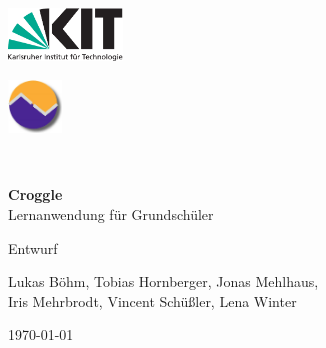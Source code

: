 \documentclass{scrreprt}
\begin{document}
\setlength{\parindent}{0pt}

\begin{titlepage}
\begin{center}
\begin{minipage}{0.4\textwidth}
	\begin{flushleft} \large
		\includegraphics[height=40pt]{../assets/kitlogo.pdf}
	\end{flushleft}
\end{minipage}
\begin{minipage}{0.4\textwidth}
	\begin{flushright} \large
		\includegraphics[height=40pt]{../assets/stlogo-600dpi.pdf}
	\end{flushright}
\end{minipage} \\[2cm]
\end{center}
\begin{center}
	{\huge \bfseries Croggle}\\[0.1cm]
	{\large  Lernanwendung für Grundschüler}
\end{center}


\begin{center}
	{\Large Entwurf}\\[0.5cm]
\end{center}
\begin{center}
	{Lukas Böhm, Tobias Hornberger, Jonas Mehlhaus, \\ Iris Mehrbrodt, Vincent Schüßler, Lena Winter} \\[1cm]
\end{center}

\begin{center}
	{\large \today}
\end{center}
	
	\vfill
	

\end{titlepage}
\end{document}
